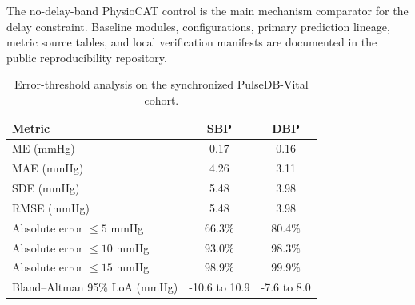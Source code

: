 \documentclass[11pt]{article}
\begin{document}
The no-delay-band PhysioCAT control is the main mechanism comparator for the delay constraint. Baseline modules, configurations, primary prediction lineage, metric source tables, and local verification manifests are documented in the public reproducibility repository.

\begin{table}[H]
\centering
\caption{Error-threshold analysis on the synchronized PulseDB-Vital cohort.}
\label{tab:thresholds}
\small
\begin{tabular}{lcc}
\toprule
Metric & SBP & DBP \\
\midrule
ME (mmHg) & 0.17 & 0.16 \\
MAE (mmHg) & 4.26 & 3.11 \\
SDE (mmHg) & 5.48 & 3.98 \\
RMSE (mmHg) & 5.48 & 3.98 \\
Absolute error $\leq 5$ mmHg & 66.3\% & 80.4\% \\
Absolute error $\leq 10$ mmHg & 93.0\% & 98.3\% \\
Absolute error $\leq 15$ mmHg & 98.9\% & 99.9\% \\
    Bland--Altman 95\% LoA (mmHg) & -10.6 to 10.9 & -7.6 to 8.0 \\
\bottomrule
\end{tabular}
\end{table}
\end{document}
